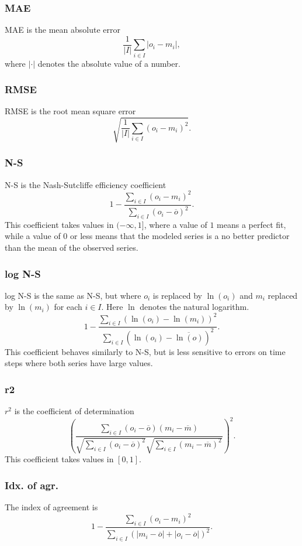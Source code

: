 \documentclass[11pt]{article}
\theoremstyle{definition}
\begin{document}
\subsubsection{MAE}
MAE is the mean absolute error
\[
\frac{1}{|I|}\sum_{i\in I}|o_i - m_i|,
\]
where $|\cdot|$ denotes the absolute value of a number.

\subsubsection{RMSE}
RMSE is the root mean square error
\[
\sqrt{\frac{1}{|I|}\sum_{i\in I}(o_i-m_i)^2}.
\]

\subsubsection{N-S}
N-S is the Nash-Sutcliffe efficiency coefficient \cite{nashsutcliffe70}
\[
1 - \frac{\sum_{i\in I}(o_i - m_i)^2}{\sum_{i\in I}(o_i-\overline{o})^2}.
\]
This coefficient takes values in $(-\infty, 1]$, where a value of $1$ means a perfect fit, while a value of $0$ or less means that the modeled series is a no better predictor than the mean of the observed series.

\subsubsection{log N-S}
log N-S is the same as N-S, but where $o_i$ is replaced by $\ln(o_i)$ and $m_i$ replaced by $\ln(m_i)$ for each $i\in I$. Here $\ln$ denotes the natural logarithm.
\[
1 - \frac{\sum_{i\in I}(\ln(o_i) - \ln(m_i))^2}{\sum_{i\in I}(\ln(o_i)-\overline{\ln(o)})^2}.
\]
This coefficient behaves similarly to N-S, but is less sensitive to errors on time steps where both series have large values.

\subsubsection{r2}
$r^2$ is the coefficient of determination
\[
\left(\frac{\sum_{i\in I}(o_i-\overline{o})(m_i-\overline{m})}{\sqrt{\sum_{i\in I}(o_i-\overline{o})^2}\sqrt{\sum_{i\in I}(m_i-\overline{m})^2}}\right)^2.
\]
This coefficient takes values in $[0, 1]$.

\subsubsection{Idx. of agr.}
The index of agreement is
\[
1 - \frac{\sum_{i\in I}(o_i-m_i)^2}{\sum_{i\in I}(|m_i-\overline{o}| + |o_i-\overline{o}|)^2}.
\]
\end{document}
